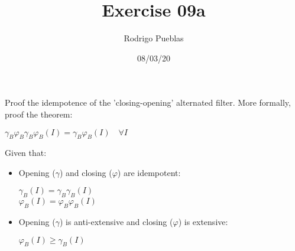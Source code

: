 \documentclass[12pt]{article}
\title{Exercise 09a}
\author{Rodrigo Pueblas}
\date{08/03/20}
\begin{document}
\maketitle

Proof the idempotence of the 'closing-opening' alternated filter. More formally, proof the theorem:
\begin{center}
$\gamma_{B} \varphi_{B} \gamma_{B} \varphi_{B}(I)= \gamma_{B} \varphi_{B} (I) \quad \forall I$
\end{center}

\newpage

Given that:
\begin{itemize}
  \item Opening ($\gamma$) and closing ($\varphi$) are idempotent:
  \begin{center}
  $\gamma_{B} (I) = \gamma_{B} \gamma_{B} (I)$ \\
  $\varphi_{B} (I) = \varphi_{B} \varphi_{B} (I)$
  \end{center}
  
  \item Opening ($\gamma$) is anti-extensive and closing ($\varphi$) is extensive:
  \begin{center}
  $\varphi_{B} (I) \ge \gamma_{B}(I)$
  \end{center}
\end{itemize}
\end{document}
